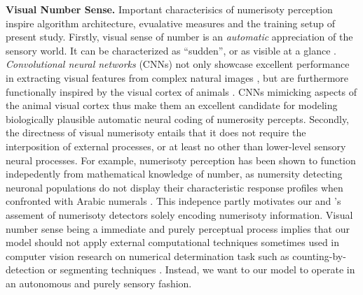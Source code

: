 \documentclass[twocolumn]{article}
\begin{document}
\newcommand{\relatedss}[2]{{\bfseries #1. }{#2}}

\relatedss{Visual Number Sense}{Important characterisics of numerisoty perception inspire algorithm architecture, evualative measures and the  training setup of present study. Firstly, visual sense of number is an \emph{automatic} appreciation of the sensory world. It can be characterized as ``sudden'', or as visible at a glance \citetext{\citealp[p.~57]{dehaene2011number}; \citealp{zhang2016salient}}. \emph{Convolutional neural networks} (CNNs) not only showcase excellent performance in extracting visual features from complex natural images \citetext{\citealp{GoogleDeepMind}; \citealp{krizhevsky2012imagenet}; \citealp[for visual number sense and CNNs see][]{zhang2016salient}}, but are furthermore functionally inspired by the visual cortex of animals \citep[specifically cats, see][]{lecun1995convolutional}. CNNs mimicking aspects of the animal visual cortex thus make them an excellent candidate for modeling biologically plausible automatic neural coding of numerosity percepts. 
Secondly, the directness of visual numerisoty entails that it does not require the interposition of external processes, or at least no other than lower-level sensory neural processes. For example, numerisoty perception has been shown to function indepedently from mathematical knowledge of number, as numersity detecting neuronal populations do not display their characteristic response profiles when confronted with Arabic numerals \citep{harvey2013topographic, poncet2016individuation}. This indepence partly motivates our and \citet{stoianov2012}'s assement of numerisoty detectors solely encoding numerisoty information. Visual number sense being a immediate and purely perceptual process implies that our model should not apply external computational techniques sometimes used in computer vision research on numerical determination task such as counting-by-detection \citep[which requires both arithmetic and iterative attention to all group members, see][]{zhang2016salient, detection2016unconstrained} or segmenting techniques \citep[e.g.][]{chattopadhyay2016counting}. Instead, we want to our model to operate in an autonomous and purely sensory fashion.}
\end{document}
